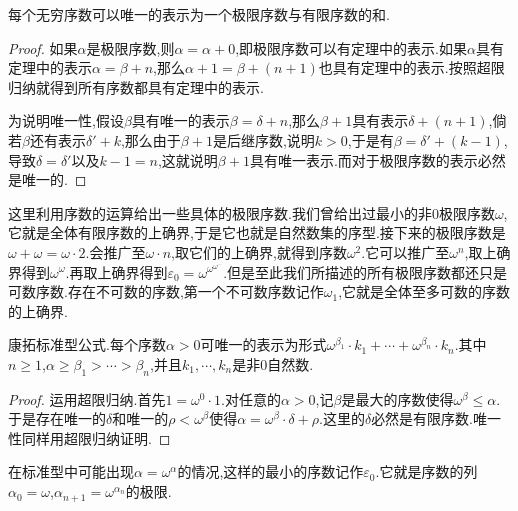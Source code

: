 每个无穷序数可以唯一的表示为一个极限序数与有限序数的和.
\begin{proof}
如果$\alpha$是极限序数,则$\alpha=\alpha+0$,即极限序数可以有定理中的表示.如果$\alpha$具有定理中的表示$\alpha=\beta+n$,那么$\alpha+1=\beta+(n+1)$也具有定理中的表示.按照超限归纳就得到所有序数都具有定理中的表示.

为说明唯一性,假设$\beta$具有唯一的表示$\beta=\delta+n$,那么$\beta+1$具有表示$\delta+(n+1)$,倘若$\beta$还有表示$\delta'+k$,那么由于$\beta+1$是后继序数,说明$k>0$,于是有$\beta=\delta'+(k-1)$,导致$\delta=\delta'$以及$k-1=n$,这就说明$\beta+1$具有唯一表示.而对于极限序数的表示必然是唯一的.
\end{proof}

这里利用序数的运算给出一些具体的极限序数.我们曾给出过最小的非0极限序数$\omega$,它就是全体有限序数的上确界,于是它也就是自然数集的序型.接下来的极限序数是$\omega+\omega=\omega\cdot2$.会推广至$\omega\cdot n$,取它们的上确界,就得到序数$\omega^2$.它可以推广至$\omega^n$,取上确界得到$\omega^{\omega}$.再取上确界得到$\varepsilon_0=\omega^{\omega^{\omega^{\cdots}}}$.但是至此我们所描述的所有极限序数都还只是可数序数.存在不可数的序数,第一个不可数序数记作$\omega_1$,它就是全体至多可数的序数的上确界.

康拓标准型公式.每个序数$\alpha>0$可唯一的表示为形式$\omega^{\beta_1}\cdot k_1+\cdots+\omega^{\beta_n}\cdot k_n$.其中$n\ge1$,$\alpha\ge\beta_1>\cdots>\beta_n$,并且$k_1,\cdots,k_n$是非0自然数.
\begin{proof}
	
	运用超限归纳.首先$1=\omega^0\cdot1$.对任意的$\alpha>0$,记$\beta$是最大的序数使得$\omega^{\beta}\le\alpha$.于是存在唯一的$\delta$和唯一的$\rho<\omega^{\beta}$使得$\alpha=\omega^{\beta}\cdot\delta+\rho$.这里的$\delta$必然是有限序数.唯一性同样用超限归纳证明.
\end{proof}

在标准型中可能出现$\alpha=\omega^{\alpha}$的情况,这样的最小的序数记作$\varepsilon_0$.它就是序数的列$\alpha_0=\omega$,$\alpha_{n+1}=\omega^{\alpha_n}$的极限.

